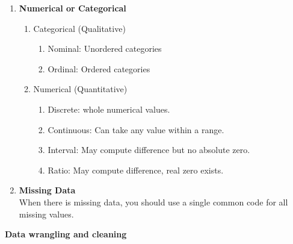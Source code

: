 \begin{enumerate}
\begin{enumerate}
    \end{enumerate}
    \item \textbf{Numerical or Categorical}
    \begin{enumerate}
        \item Categorical (Qualitative)
        \begin{enumerate}
            \item Nominal: Unordered categories 
            \item Ordinal: Ordered categories
        \end{enumerate}
        \item Numerical (Quantitative)
        \begin{enumerate}
            \item Discrete: whole numerical values.
            \item Continuous: Can take any value within a range.
            \item Interval: May compute difference but no absolute zero.
            \item Ratio: May compute difference, real zero exists.
        \end{enumerate}
    \end{enumerate}
    \item \textbf{Missing Data} \\
    When there is missing data, you should use a single common code for all missing values.
\end{enumerate}
\textbf{Data wrangling and cleaning}
